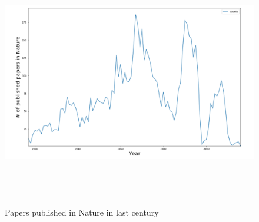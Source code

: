 \documentclass[a4paper, 11pt]{article}
\begin{document}
\begin{figure}[h]
    \centering
    \includegraphics[width=17cm,height=11cm]{nature_year_wise}
    \caption{Papers published in Nature in last century}
    \label{fig:nature_year_wise}
\end{figure}
\end{document}
